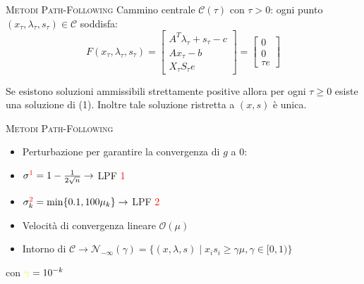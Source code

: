 \begin{frame}[t]{\textsc{\LARGE \textcolor{burntumber}{Metodi Path-Following}}}
	Cammino centrale $\mathcal{C}(\tau)$ con $\tau  > 0$: ogni punto $(x_{\tau}, \lambda_{\tau}, s_{\tau})\in \mathcal{C}$ soddisfa:
\begin{equation}\label{Ftao}\tag{1}
\mathit{F}(x_{\tau},\lambda_{\tau},s_{\tau})= \begin{bmatrix}
A^{T}\lambda_{\tau}+s_{\tau}-c \\Ax_{\tau}-b \\X_{\tau}S_{\tau}e
\end{bmatrix}=\begin{bmatrix}0\\0\\ \tau e \end{bmatrix}
\end{equation}

\begin{theorem}
	Se esistono soluzioni ammissibili strettamente positive allora per ogni $\tau\geq0$ esiste una soluzione di (1). Inoltre tale
	soluzione ristretta a $(x, s)$ è unica.
\end{theorem}
\end{frame}


\begin{frame}{\textsc{\LARGE \textcolor{burntumber}{Metodi Path-Following}}}

\begin{itemize}
	\item Perturbazione per garantire la convergenza di $g$ a $0$:
\end{itemize}
\pause
{}
\pause
\begin{itemize}
	\item[] \;\;\;\;\;\;\;\;\;\;\;\;\;\;\;\;\;\;\;\;\;\;\;\;\;$\sigma^{\textcolor{red}{1}} = 1 -\frac{1}{2\sqrt{n}}\rightarrow$\textrm{ LPF \textcolor{red}{1}}\pause
	\item[] \;\;\;\;\;\;\;\;\;\;\;\;\;\;\;\;\;\;\;\;\;\;\;\;\;$\sigma^{\textcolor{red}{2}}_{k} = \min\{0.1, 100\mu_{k}\}\rightarrow$\textrm{ LPF \textcolor{red}{2}}\pause	
\end{itemize}
\begin{itemize}
\item Velocità di convergenza lineare $\mathcal{O}(\mu)$
\pause
\item Intorno di $\mathcal{C}\rightarrow \mathcal{N}_{-\infty}(\gamma) =\{ (x, \lambda,s)\;|\; x_{i}s_{i} \geq \gamma \mu, \gamma \in [0,1)\}$
\end{itemize}
\;\;\;\;\;\;\;\;\;\;\;\;\;\;\;\;\;\;\;\;\;\;\;\;\;\;\;\;con $ \textcolor{yellow}{\mathbf{\gamma}}=10^{-k}$
\end{frame}


